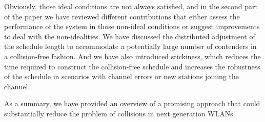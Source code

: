 \documentclass[journal]{IEEEtran}
\begin{document}
Obviously, those ideal conditions are not always satisfied, and in the second part of the paper we have reviewed different contributions that either assess the performance of the system in those non-ideal conditions or suggest improvements to deal with the non-idealities.
We have discussed the distributed adjustment of the schedule length to accommodate a potentially large number of contenders in a collision-free fashion.
And we have also introduced stickiness, which reduces the time required to construct the collision-free schedule and increases the robustness of the schedule in scenarios with channel errors or new stations joining the channel.

As a summary, we have provided an overview of a promising approach that could substantially reduce the problem of collisions in next generation WLANs.



%
%



%
%
\end{document}
